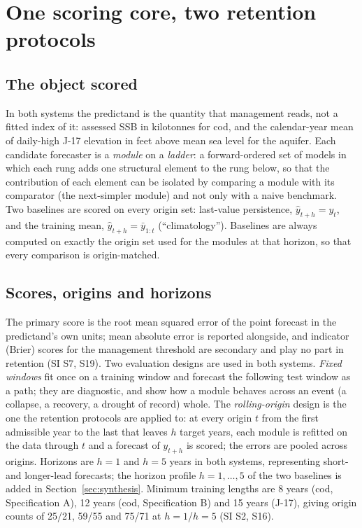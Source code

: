 \documentclass[preprint,11pt,authoryear]{elsarticle}
\theoremstyle{definition}
\theoremstyle{remark}
\begin{document}
\section{One scoring core, two retention protocols}\label{sec:design}

\subsection{The object scored}\label{sec:object}

In both systems the predictand is the quantity that management reads, not a fitted index of it: assessed SSB in kilotonnes for cod, and the calendar-year mean of daily-high J-17 elevation in feet above mean sea level for the aquifer. Each candidate forecaster is a \emph{module} on a \emph{ladder}: a forward-ordered set of models in which each rung adds one structural element to the rung below, so that the contribution of each element can be isolated by comparing a module with its comparator (the next-simpler module) and not only with a naive benchmark. Two baselines are scored on every origin set: last-value persistence, $\hat y_{t+h}=y_t$, and the training mean, $\hat y_{t+h}=\bar y_{1:t}$ (``climatology''). Baselines are always computed on exactly the origin set used for the modules at that horizon, so that every comparison is origin-matched.

\subsection{Scores, origins and horizons}\label{sec:scores}

The primary score is the root mean squared error of the point forecast in the predictand's own units; mean absolute error is reported alongside, and indicator (Brier) scores for the management threshold are secondary and play no part in retention (SI S7, S19). Two evaluation designs are used in both systems. \emph{Fixed windows} fit once on a training window and forecast the following test window as a path; they are diagnostic, and show how a module behaves across an event (a collapse, a recovery, a drought of record) whole. The \emph{rolling-origin} design \citep{Tashman2000} is the one the retention protocols are applied to: at every origin $t$ from the first admissible year to the last that leaves $h$ target years, each module is refitted on the data through $t$ and a forecast of $y_{t+h}$ is scored; the errors are pooled across origins. Horizons are $h=1$ and $h=5$ years in both systems, representing short- and longer-lead forecasts; the horizon profile $h=1,\dots,5$ of the two baselines is added in Section~\ref{sec:synthesis}. Minimum training lengths are 8 years (cod, Specification A), 12 years (cod, Specification B) and 15 years (J-17), giving origin counts of 25/21, 59/55 and 75/71 at $h=1$/$h=5$ (SI S2, S16).
\end{document}
